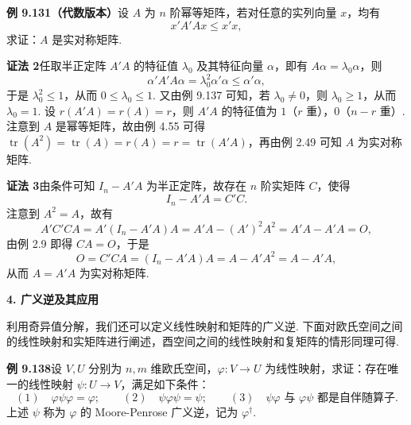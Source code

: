 \documentclass[UTF8, 12pt, fontset=fandol, oneside]{ctexart}
\begin{document}
\noindent\textbf{例 9.131（代数版本）}\quad 设 $A$ 为 $n$ 阶幂等矩阵，若对任意的实列向量 $x$，均有
\[
x'A'Ax\le x'x,
\]
求证：$A$ 是实对称矩阵.

\noindent\textbf{证法 2}\quad 任取半正定阵 $A'A$ 的特征值 $\lambda_0$ 及其特征向量 $\alpha$，即有 $A\alpha=\lambda_0\alpha$，则
\[
\alpha'A'A\alpha=\lambda_0^2\alpha'\alpha\le\alpha'\alpha,
\]
于是 $\lambda_0^2\le1$，从而 $0\le\lambda_0\le1$. 又由例 9.137 可知，若 $\lambda_0\ne0$，则 $\lambda_0\ge1$，从而 $\lambda_0=1$. 设 $r(A'A)=r(A)=r$，则 $A'A$ 的特征值为 $1$（$r$ 重），$0$（$n-r$ 重）. 注意到 $A$ 是幂等矩阵，故由例 4.55 可得 $\operatorname{tr}(A^2)=\operatorname{tr}(A)=r(A)=r=\operatorname{tr}(A'A)$，再由例 2.49 可知 $A$ 为实对称矩阵.

\noindent\textbf{证法 3}\quad 由条件可知 $I_n-A'A$ 为半正定阵，故存在 $n$ 阶实矩阵 $C$，使得
\[
I_n-A'A=C'C.
\]
注意到 $A^2=A$，故有
\[
A'C'CA=A'(I_n-A'A)A=A'A-(A')^2A^2=A'A-A'A=O,
\]
由例 2.9 即得 $CA=O$，于是
\[
O=C'CA=(I_n-A'A)A=A-A'A^2=A-A'A,
\]
从而 $A=A'A$ 为实对称矩阵.

\noindent\textbf{4. 广义逆及其应用}

利用奇异值分解，我们还可以定义线性映射和矩阵的广义逆. 下面对欧氏空间之间的线性映射和实矩阵进行阐述，酉空间之间的线性映射和复矩阵的情形同理可得.

\noindent\textbf{例 9.138}\quad 设 $V,U$ 分别为 $n,m$ 维欧氏空间，$\varphi:V\to U$ 为线性映射，求证：存在唯一的线性映射 $\psi:U\to V$，满足如下条件：
\[
(1)\quad \varphi\psi\varphi=\varphi;\qquad
(2)\quad \psi\varphi\psi=\psi;\qquad
(3)\quad \psi\varphi\text{ 与 }\varphi\psi\text{ 都是自伴随算子.}
\]
上述 $\psi$ 称为 $\varphi$ 的 Moore-Penrose 广义逆，记为 $\varphi^\dagger$.
\end{document}
